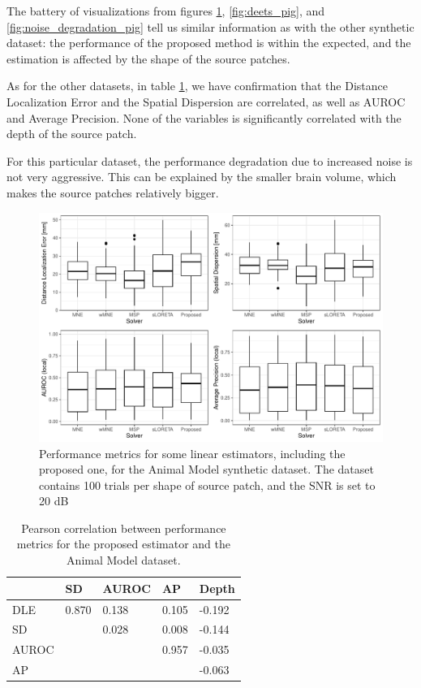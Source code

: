 The battery of visualizations from figures \ref{fig:results1_pig}, \ref{fig:deets_pig}, and \ref{fig:noise_degradation_pig} tell us similar information as with the other synthetic dataset: the performance of the proposed method is within the expected, and the estimation is affected by the shape of the source patches.

As for the other datasets, in table \ref{tab:corr_pig}, we have confirmation that the Distance Localization Error and the Spatial Dispersion are correlated, as well as AUROC and Average Precision.
%
None of the variables is significantly correlated with the depth of the source patch.

For this particular dataset, the performance degradation due to increased noise is not very aggressive.
%
This can be explained by the smaller brain volume, which makes the source patches relatively bigger.

\begin{figure}
    \centering
    \includegraphics[width=0.9\linewidth]{img_stats/pig_plot_EvalMetrics_protocol04_vol5k_pigALL.pdf}
    \caption{Performance metrics for some linear estimators, including the proposed one, for the Animal Model synthetic dataset. The dataset contains 100 trials per shape of source patch, and the SNR is set to 20 dB}
    \label{fig:results1_pig}
\end{figure}

\begin{table}[]
\centering
\begin{tabular}{@{}lllll@{}}
\toprule
      & SD    & AUROC & AP    & Depth  \\
\midrule
DLE   & 0.870 & 0.138 & 0.105 & -0.192 \\
SD    &       & 0.028 & 0.008 & -0.144 \\
AUROC &       &       & 0.957 & -0.035 \\
AP    &       &       &       & -0.063 \\
\bottomrule
\end{tabular}
\caption{Pearson correlation between performance metrics for the proposed estimator and the Animal Model dataset.}
\label{tab:corr_pig}
\end{table}

